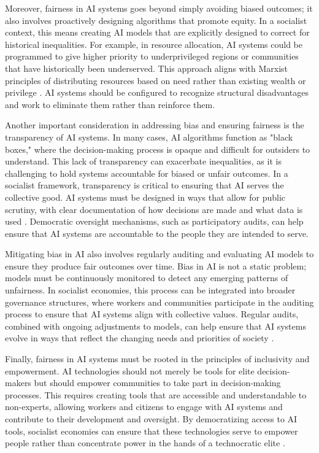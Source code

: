 \begin{refsection}
Moreover, fairness in AI systems goes beyond simply avoiding biased outcomes; it also involves proactively designing algorithms that promote equity. In a socialist context, this means creating AI models that are explicitly designed to correct for historical inequalities. For example, in resource allocation, AI systems could be programmed to give higher priority to underprivileged regions or communities that have historically been underserved. This approach aligns with Marxist principles of distributing resources based on need rather than existing wealth or privilege \cite[pp.~245-248]{marx2023}. AI systems should be configured to recognize structural disadvantages and work to eliminate them rather than reinforce them.

Another important consideration in addressing bias and ensuring fairness is the transparency of AI systems. In many cases, AI algorithms function as "black boxes," where the decision-making process is opaque and difficult for outsiders to understand. This lack of transparency can exacerbate inequalities, as it is challenging to hold systems accountable for biased or unfair outcomes. In a socialist framework, transparency is critical to ensuring that AI serves the collective good. AI systems must be designed in ways that allow for public scrutiny, with clear documentation of how decisions are made and what data is used \cite[pp.~89-92]{treccani2021}. Democratic oversight mechanisms, such as participatory audits, can help ensure that AI systems are accountable to the people they are intended to serve.

Mitigating bias in AI also involves regularly auditing and evaluating AI models to ensure they produce fair outcomes over time. Bias in AI is not a static problem; models must be continuously monitored to detect any emerging patterns of unfairness. In socialist economies, this process can be integrated into broader governance structures, where workers and communities participate in the auditing process to ensure that AI systems align with collective values. Regular audits, combined with ongoing adjustments to models, can help ensure that AI systems evolve in ways that reflect the changing needs and priorities of society \cite[pp.~112-115]{tapscott2016}.

Finally, fairness in AI systems must be rooted in the principles of inclusivity and empowerment. AI technologies should not merely be tools for elite decision-makers but should empower communities to take part in decision-making processes. This requires creating tools that are accessible and understandable to non-experts, allowing workers and citizens to engage with AI systems and contribute to their development and oversight. By democratizing access to AI tools, socialist economies can ensure that these technologies serve to empower people rather than concentrate power in the hands of a technocratic elite \cite[pp.~67-70]{scholz2013}.


\end{refsection}

